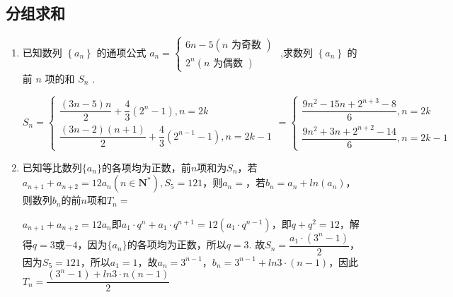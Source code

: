 \subsection*{分组求和}
\begin{enumerate}
    \item 已知数列 $\left\{  {a}_{n}\right\}$ 的通项公式 ${a}_{n} = \left\{  \begin{array}{l} {6n} - 5\left( {n\text{ 为奇数 }}\right) \\  {2}^{n}\left( {n\text{ 为偶数 }}\right)  \end{array}\right.$ ,求数列 $\left\{  {a}_{n}\right\}$ 的前 $n$ 项的和 ${S}_{n}$ .
    \begin{jieda}
    
        ${S}_{n} = \left\{  {\begin{array}{l} \dfrac{\left( {{3n} - 5}\right) n}{2} + \dfrac{4}{3}\left( {{2}^{n} - 1}\right) ,n = {2k} \\  \dfrac{\left( {{3n} - 2}\right) \left( {n + 1}\right) }{2} + \dfrac{4}{3}\left( {{2}^{n - 1} - 1}\right) ,n = {2k} - 1 \end{array} = \left\{  \begin{array}{l} \dfrac{9{n}^{2} - {15n} + {2}^{n + 3} - 8}{6},n = {2k} \\  \dfrac{9{n}^{2} + {3n} + {2}^{n + 2} - {14}}{6},n = {2k} - 1 \end{array}\right. }\right.$
    \end{jieda}
    \item 已知等比数列$\{a_n\}$的各项均为正数，前$n$项和为$S_n$，若$a_{n+1} + a_{n+2} = 12a_n(n \in \mathbf{N^*}), S_5 = 121$，则$a_n = $，若$b_n = a_n + ln (a_n)$，则数列$b_n$的前$n$项和$T_n = $
    \begin{jieda}
        $a_{n+1} + a_{n+2} = 12a_n$即$a_1 \cdot q^n + a_1 \cdot q^{n+1} = 12(a_1 \cdot q^{n-1})$，即$q + q^2 = 12$，解得$q = 3$或$-4$，因为$\{a_n\}$的各项均为正数，所以$q = 3$. 故$S_n = \dfrac{a_1 \cdot (3^n - 1)}{2}$，因为$S_5 = 121$，所以$a_1 = 1$，故$a_n = 3^{n-1}$，$b_n = 3^{n-1} + ln3 \cdot (n-1)$，因此$T_n = \dfrac{(3^n - 1) + ln3 \cdot n(n-1)}{2}$
    \end{jieda}
\end{enumerate}
